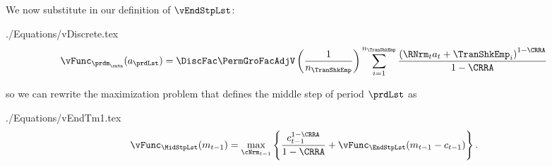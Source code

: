\documentclass[SolvingMicroDSOPs]{subfiles}
\begin{document}
We now substitute in our definition of $\vEndStpLst$:
\begin{verbatimwrite}{./Equations/vDiscrete.tex}
  \begin{equation}\begin{gathered}\begin{aligned}
        \vFunc_{{\prdm}_\cntn}({a}_{\prdLst})  & =   \DiscFac \PermGroFacAdjV\left(\frac{1}{n_{\TranShkEmp}}\right)\sum_{i=1}^{n_{\TranShkEmp}}   \frac{\left(\RNrm_{\prd} {a}_{\prd} + \TranShkEmp_{i}\right)^{1-\CRRA}}{1-\CRRA} \label{eq:vDiscrete}
      \end{aligned}\end{gathered}\end{equation}
\end{verbatimwrite}
\unskip
so we can rewrite the maximization problem that defines the middle step of period {$\prdLst$} as %
\begin{verbatimwrite}{./Equations/vEndTm1.tex}%
  \begin{equation}\begin{gathered}\begin{aligned}
        {\vFunc}_{\MidStpLst}({m}_{\prdT-1})   & = \max_{\cNrm_{\prdT-1}}
        \left\{
          \frac{{c}_{\prdT-1}^{1-\CRRA}}{1-\CRRA} +
          \vFunc_{\EndStpLst}({m}_{\prdT-1}-{c}_{\prdT-1})
        \right\}.
        \label{eq:vEndTm1}
      \end{aligned}\end{gathered}\end{equation}%
\end{verbatimwrite}
\unskip



\begin{comment}
  In the {\SMDSOPntbk} notebook, the section ``Discretization of the Income Shock Distribution'' provides code that instantiates the \texttt{DiscreteApproximation} class defined in the \texttt{resources} module. This class creates a 7-point discretization of the continuous log-normal distribution of transitory shocks to income by utilizing seven points, where the mean value is $-.5 \sigma^2$, and the standard deviation is $\sigma = .5$.

  A close look at the \texttt{DiscreteApproximation} class and its subclasses should convince you that the code is simply a computational implementation of the mathematical description of equiprobable discrete approximation in this section. Moreover, the Python code generates a graph of the discretized distribution depicted in \ref{fig:discreteapprox}.
\end{comment}
\end{document}
